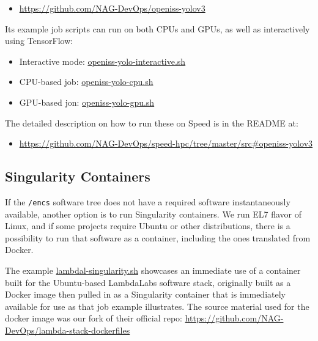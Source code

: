 \begin{itemize}
	\item \url{https://github.com/NAG-DevOps/openiss-yolov3}
\end{itemize}

Its example job scripts can run on both CPUs and GPUs,
as well as interactively using TensorFlow:

\begin{itemize}
	\item Interactive mode:
  \href{https://github.com/NAG-DevOps/speed-hpc/blob/master/src/openiss-yolo-interactive.sh}
  {openiss-yolo-interactive.sh}
	\item CPU-based job:
  \href{https://github.com/NAG-DevOps/speed-hpc/blob/master/src/openiss-yolo-cpu.sh}
  {openiss-yolo-cpu.sh}
	\item GPU-based jon:
  \href{https://github.com/NAG-DevOps/speed-hpc/blob/master/src/openiss-yolo-gpu.sh}
  {openiss-yolo-gpu.sh}
\end{itemize}

The detailed description on how to run these on Speed is
in the README at:

\begin{itemize}
	\item \url{https://github.com/NAG-DevOps/speed-hpc/tree/master/src#openiss-yolov3}
\end{itemize}

\subsection{Singularity Containers}
\label{sect:singularity-containers}

If the \texttt{/encs} software tree does not have a required software
instantaneously available, another option is to run Singularity
containers. We run EL7 flavor of Linux, and if some projects
require Ubuntu or other distributions, there is a possibility
to run that software as a container, including the ones
translated from Docker.

The example
  \href{https://github.com/NAG-DevOps/speed-hpc/blob/master/src/lambdal-singularity.sh}
  {lambdal-singularity.sh}
showcases an immediate use of a container built for the Ubuntu-based
LambdaLabs software stack, originally built as a Docker image then
pulled in as a Singularity container that is immediately available
for use as that job example illustrates. The source material
used for the docker image was our fork of their official
repo: \url{https://github.com/NAG-DevOps/lambda-stack-dockerfiles}

